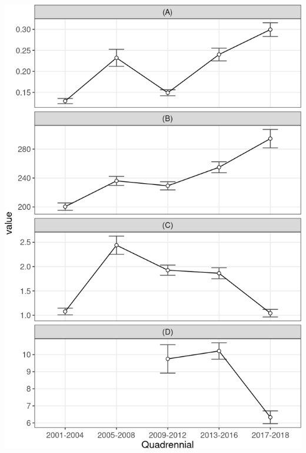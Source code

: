 \documentclass[10pt,landscape,a3paper]{article}
\begin{document}
\begin{center}\includegraphics{img/modelling/aa-eda-ts-12} \end{center}
\end{document}
